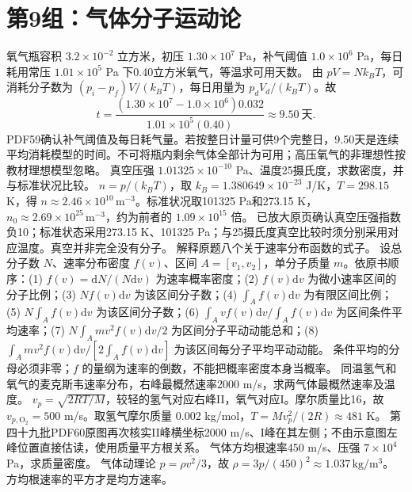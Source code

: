 \section{第9组：气体分子运动论}
\problemtext 氧气瓶容积 $3.2\times10^{-2}$ 立方米，初压 $1.30\times10^7$ Pa，补气阈值 $1.0\times10^6$ Pa，每日耗用常压 $1.01\times10^5$ Pa 下0.40立方米氧气，等温求可用天数。
\workings 由 $pV=Nk_BT$，可消耗分子数为 $(p_i-p_f)V/(k_BT)$，每日用量为 $p_dV_d/(k_BT)$。故
\[
t=\frac{(1.30\times10^7-1.0\times10^6)0.032}{1.01\times10^5(0.40)}\approx9.50\ \text{天}.
\]
\crosscheck PDF59确认补气阈值及每日耗气量。若按整日计量可供9个完整日，9.50天是连续平均消耗模型的时间。不可将瓶内剩余气体全部计为可用；高压氧气的非理想性按教材理想模型忽略。
\problemtext 真空压强 $1.01325\times10^{-10}$ Pa、温度25摄氏度，求数密度，并与标准状况比较。
\workings $n=p/(k_BT)$，取 $k_B=1.380649\times10^{-23}$ J/K，$T=298.15$ K，得 $n\approx2.46\times10^{10}\,\mathrm{m^{-3}}$。标准状况取101325 Pa和273.15 K，$n_0\approx2.69\times10^{25}\,\mathrm{m^{-3}}$，约为前者的 $1.09\times10^{15}$ 倍。
\crosscheck 已放大原页确认真空压强指数负10；标准状态采用273.15 K、101325 Pa；与25摄氏度真空比较时须分别采用对应温度。真空并非完全没有分子。
\problemtext 解释原题八个关于速率分布函数的式子。
\workings 设总分子数 $N$、速率分布密度 $f(v)$、区间 $A=[v_1,v_2]$，单分子质量 $m$。依原书顺序：(1) $f(v)=\mathrm dN/(N\mathrm dv)$ 为速率概率密度；(2) $f(v)\mathrm dv$ 为微小速率区间的分子比例；(3) $Nf(v)\mathrm dv$ 为该区间分子数；(4) $\int_A f(v)\mathrm dv$ 为有限区间比例；(5) $N\int_A f(v)\mathrm dv$ 为该区间分子数；(6) $\int_A vf(v)\mathrm dv/\int_A f(v)\mathrm dv$ 为区间条件平均速率；(7) $N\int_A mv^2f(v)\mathrm dv/2$ 为区间分子平动动能总和；(8) $\int_A mv^2f(v)\mathrm dv/[2\int_A f(v)\mathrm dv]$ 为该区间每分子平均平动动能。
\crosscheck 条件平均的分母必须非零；$f$ 的量纲为速率的倒数，不能把概率密度本身当概率。
\problemtext 同温氢气和氧气的麦克斯韦速率分布，右峰最概然速率2000 m/s，求两气体最概然速率及温度。
\workings $v_p=\sqrt{2RT/M}$，较轻的氢气对应右峰II，氧气对应I。摩尔质量比16，故 $v_{p,\mathrm O_2}=500$ m/s。取氢气摩尔质量 $0.002$ kg/mol，$T=Mv_p^2/(2R)\approx481$ K。
\crosscheck 第四十九批PDF60原图再次核实II峰横坐标2000 m/s、I峰在其左侧；不由示意图左峰位置直接估读，使用质量平方根关系。
\problemtext 气体方均根速率450 m/s、压强 $7\times10^4$ Pa，求质量密度。
\workings 气体动理论 $p=\rho\overline{v^2}/3$，故 $\rho=3p/(450)^2\approx1.037\,\mathrm{kg/m^3}$。
\crosscheck 方均根速率的平方才是均方速率。
